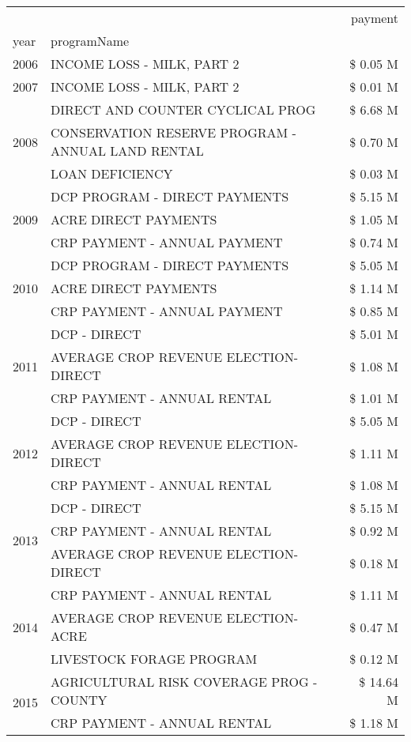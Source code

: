\begin{tabular}{llr}
\toprule
 &  & payment \\
year & programName &  \\
\midrule
2006 & INCOME LOSS - MILK, PART 2 & \$ 0.05 M \\
\cline{1-3}
2007 & INCOME LOSS - MILK, PART 2 & \$ 0.01 M \\
\cline{1-3}
\multirow[t]{3}{*}{2008} & DIRECT AND COUNTER CYCLICAL PROG & \$ 6.68 M \\
 & CONSERVATION RESERVE PROGRAM - ANNUAL LAND RENTAL & \$ 0.70 M \\
 & LOAN DEFICIENCY & \$ 0.03 M \\
\cline{1-3}
\multirow[t]{3}{*}{2009} & DCP PROGRAM - DIRECT PAYMENTS & \$ 5.15 M \\
 & ACRE DIRECT PAYMENTS & \$ 1.05 M \\
 & CRP PAYMENT - ANNUAL PAYMENT & \$ 0.74 M \\
\cline{1-3}
\multirow[t]{3}{*}{2010} & DCP PROGRAM - DIRECT PAYMENTS & \$ 5.05 M \\
 & ACRE DIRECT PAYMENTS & \$ 1.14 M \\
 & CRP PAYMENT - ANNUAL PAYMENT & \$ 0.85 M \\
\cline{1-3}
\multirow[t]{3}{*}{2011} & DCP - DIRECT & \$ 5.01 M \\
 & AVERAGE CROP REVENUE ELECTION-DIRECT & \$ 1.08 M \\
 & CRP PAYMENT - ANNUAL RENTAL & \$ 1.01 M \\
\cline{1-3}
\multirow[t]{3}{*}{2012} & DCP - DIRECT & \$ 5.05 M \\
 & AVERAGE CROP REVENUE ELECTION-DIRECT & \$ 1.11 M \\
 & CRP PAYMENT - ANNUAL RENTAL & \$ 1.08 M \\
\cline{1-3}
\multirow[t]{3}{*}{2013} & DCP - DIRECT & \$ 5.15 M \\
 & CRP PAYMENT - ANNUAL RENTAL & \$ 0.92 M \\
 & AVERAGE CROP REVENUE ELECTION-DIRECT & \$ 0.18 M \\
\cline{1-3}
\multirow[t]{3}{*}{2014} & CRP PAYMENT - ANNUAL RENTAL & \$ 1.11 M \\
 & AVERAGE CROP REVENUE ELECTION-ACRE & \$ 0.47 M \\
 & LIVESTOCK FORAGE PROGRAM & \$ 0.12 M \\
\cline{1-3}
\multirow[t]{3}{*}{2015} & AGRICULTURAL RISK COVERAGE PROG - COUNTY & \$ 14.64 M \\
 & CRP PAYMENT - ANNUAL RENTAL & \$ 1.18 M \\

\end{tabular}
